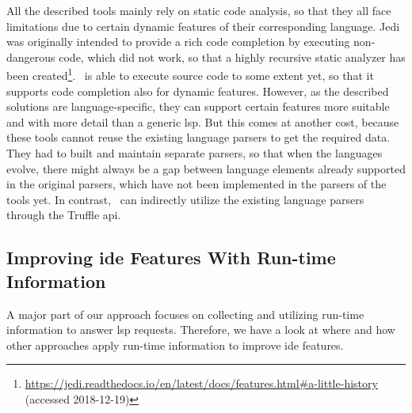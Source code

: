     All the described tools mainly rely on static code analysis, so that they all face limitations due to certain dynamic features of their corresponding language. Jedi was originally intended to provide a rich code completion by executing non-dangerous code, which did not work, so that a highly recursive static analyzer has been created\footnote{\url{https://jedi.readthedocs.io/en/latest/docs/features.html\#a-little-history}\\(accessed 2018-12-19)}. \graallsp~is able to execute source code to some extent yet, so that it supports code completion also for dynamic features. However, as the described solutions are language-specific, they can support certain features more suitable and with more detail than a generic \ac{lsp}. But this comes at another cost, because these tools cannot reuse the existing language parsers to get the required data. They had to built and maintain separate parsers, so that when the languages evolve, there might always be a gap between language elements already supported in the original parsers, which have not been implemented in the parsers of the tools yet. In contrast, \graallsp~can indirectly utilize the existing language parsers through the Truffle \ac{api}.


\subsection{Improving \acs{ide} Features With Run-time Information}
\label{sec:rw:collectionRunTimeInformation}

    A major part of our approach focuses on collecting and utilizing run-time information to answer \ac{lsp} requests. Therefore, we have a look at where and how other approaches apply run-time information to improve \ac{ide} features.


